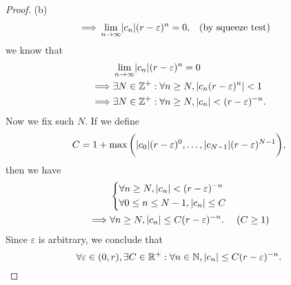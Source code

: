\begin{proof}{(b)}
\begin{align*}
    \implies & \lim_{n \to \infty} \abs{c_n} (r - \varepsilon)^n = 0,                                      &  & \text{(by squeeze test)}
  \end{align*}
  we know that
  \begin{align*}
             & \lim_{n \to \infty} \abs{c_n} (r - \varepsilon)^n = 0                      \\
    \implies & \exists N \in \Z^+ : \forall n \geq N, \abs{c_n (r - \varepsilon)^n} < 1   \\
    \implies & \exists N \in \Z^+ : \forall n \geq N, \abs{c_n} < (r - \varepsilon)^{-n}.
  \end{align*}
  Now we fix such \(N\).
  If we define
  \[
    C = 1 + \max\bigg(\abs{c_0} (r - \varepsilon)^0, \dots, \abs{c_{N - 1}} (r - \varepsilon)^{N - 1}\bigg),
  \]
  then we have
  \begin{align*}
             & \begin{dcases}
                 \forall n \geq N, \left\lvert c_n\right\rvert < (r - \varepsilon)^{-n} \\
                 \forall 0 \leq n \leq N - 1, \left\lvert c_n\right\rvert \leq C
               \end{dcases}                    \\
    \implies & \forall n \geq N, \left\lvert c_n\right\rvert \leq C (r - \varepsilon)^{-n}. & (C \geq 1)
  \end{align*}
  Since \(\varepsilon\) is arbitrary, we conclude that
  \[
    \forall \varepsilon \in (0, r), \exists C \in \mathbb{R}^+ : \forall n \in \mathbb{N}, \left\lvert c_n\right\rvert \leq C (r - \varepsilon)^{-n}.
  \]
\end{proof}

